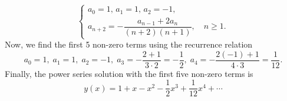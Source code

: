 \documentclass[11pt]{article}
\begin{document}
\begin{solution}
\begin{equation*}
{\begin{cases}
a_{0}=1, \, a_{1}=1,\, a_{2} =-1, \\
a_{n+2} = -\dfrac{a_{n-1} + 2a_{n}}{(n+2)(n+1)}, \quad n\geq 1.
\end{cases}
}
\end{equation*}
Now, we find the first 5 non-zero terms using the recurrence relation
\begin{equation*}
a_{0}=1, \; a_{1}=1,\; a_{2} =-1,\; a_{3} = -\frac{2+1}{3\cdot2}= -\frac{1}{2}, \; a_{4} = -\frac{2(-1)+1}{4\cdot3}= \frac{1}{12}.
\end{equation*}
Finally, the power series solution with the first five non-zero terms is
\begin{equation*}
\boxed{y(x)=1+x-x^{2} -\frac{1}{2}x^{3} +\frac{1}{12}x^{4}+\cdots}
\end{equation*}
\end{solution}
\end{document}
